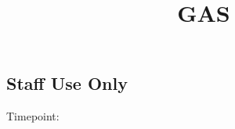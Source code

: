\documentclass[
  14pt,
  english,
  a4paper,
  sdaps_style=code128,
  checkmode=check,
  print_questionnaire_id
]{sdapsclassic}
\title{GAS}
\author{}
\date{}
\begin{document}
\begin{questionnaire}[noinfo]


\section{Staff Use Only}

    \noindent
    \begin{minipage}[t]{0.48\linewidth}
    \end{minipage}\hfill
    \begin{minipage}[t]{0.48\linewidth}
    \end{minipage}

    \noindent
    \begin{minipage}[c]{3cm}
        Timepoint:
    \end{minipage}%
    \begin{minipage}[c]{\dimexpr\linewidth-1cm\relax}
        \begin{optionquestion}[cols=4, var=timepoint]{}
        \end{optionquestion}
    \end{minipage}


\end{questionnaire}
\end{document}

